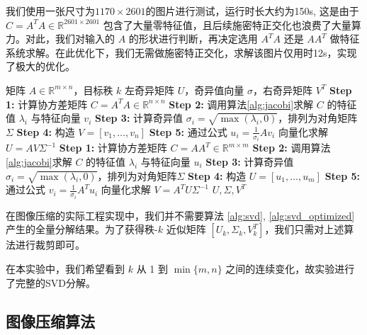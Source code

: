 	我们使用一张尺寸为$1170 \times 2601$的图片进行测试，运行时长大约为150s, 这是由于 $C = A^T A \in \mathbb{R}^{2601 \times 2601}$ 包含了大量零特征值，且后续施密特正交化也浪费了大量算力。对此，我们对输入的 $A$ 的形状进行判断，再决定选用 $A^T A$ 还是 $AA^T$ 做特征系统求解。在此优化下，我们无需做施密特正交化，求解该图片仅用时12s，实现了极大的优化。
	
	\begin{algorithm}[H]
		\caption{基于矩阵形状优化的 SVD 分解算法}
		\label{alg:svd_optimized}
		\begin{algorithmic}[1]
			\Require 矩阵 $A \in \mathbb{R}^{m \times n}$，目标秩 $k$
			\Ensure 左奇异矩阵 $U$，奇异值向量 $\sigma$，右奇异矩阵 $V^T$
			\State
			 
			\State \textbf{Step 1:} 计算协方差矩阵 $C = A^T A \in \mathbb{R}^{n \times n}$
			\State \textbf{Step 2:} 调用算法\ref{alg:jacobi}求解 $C$ 的特征值 $\lambda_i$ 与特征向量 $v_i$
			\State \textbf{Step 3:} 计算奇异值 $\sigma_i = \sqrt{\max(\lambda_i, 0)}$，排列为对角矩阵$\Sigma$
			\State \textbf{Step 4:} 构造 $V = [v_1, \dots, v_n]$
			\State \textbf{Step 5:} 通过公式 $u_i = \frac{1}{\sigma_i} A v_i$ 向量化求解 $U = A V \Sigma^{-1}$
			\Else {}
			\State \textbf{Step 1:} 计算协方差矩阵 $C = A A^T \in \mathbb{R}^{m \times m}$
			\State \textbf{Step 2:} 调用算法\ref{alg:jacobi}求解 $C$ 的特征值 $\lambda_i$ 与特征向量 $u_i$
			\State \textbf{Step 3:} 计算奇异值 $\sigma_i = \sqrt{\max(\lambda_i, 0)}$，排列为对角矩阵$\Sigma$
			\State \textbf{Step 4:} 构造 $U = [u_1, \dots, u_m]$
			\State \textbf{Step 5:} 通过公式 $v_i = \frac{1}{\sigma_i} A^T u_i$ 向量化求解 $V = A^T U \Sigma^{-1}$
			\EndIf
			\State
			\State \Return $U, \Sigma, V^T$
		\end{algorithmic}
	\end{algorithm}
	
	\begin{rmk}
		在图像压缩的实际工程实现中，我们并不需要算法 \ref{alg:svd}, \ref{alg:svd_optimized} 产生的全量分解结果。为了获得秩-$k$ 近似矩阵 $[U_k, \Sigma_k, V_k^T]$，我们只需对上述算法进行裁剪即可。
		
	\end{rmk}
	
	在本实验中，我们希望看到 $k$ 从 1 到 $\min\{m,n\}$ 之间的连续变化，故实验进行了完整的SVD分解。
	
	\subsection{图像压缩算法}
	
